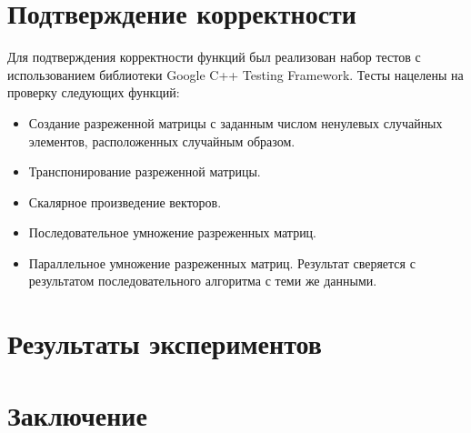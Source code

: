 \documentclass{report}
\begin{document}
\section*{Подтверждение корректности}
Для подтверждения корректности функций был реализован набор тестов с использованием библиотеки Google C++ Testing Framework. Тесты нацелены на проверку следующих функций:
\begin {itemize}
	\item Создание разреженной матрицы с заданным числом ненулевых случайных элементов, расположенных случайным образом.
	\item Транспонирование разреженной матрицы.
	\item Скалярное произведение векторов.
	\item Последовательное умножение разреженных матриц.
	\item Параллельное умножение разреженных матриц. Результат сверяется с результатом последовательного алгоритма с теми же данными.
\end {itemize}
\newpage


\section*{Результаты экспериментов}


\newpage


\section*{Заключение}

\newpage
\end{document}
